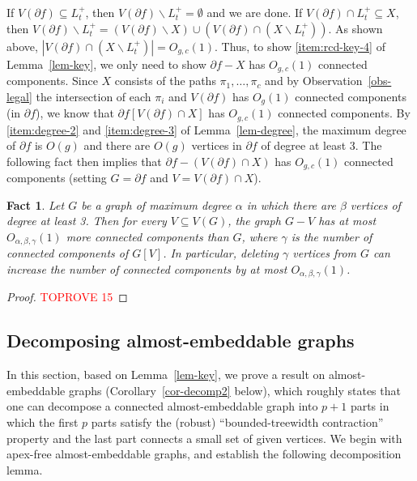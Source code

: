 \documentclass[a4paper,11pt]{article}
\numberwithin{lemma}{section}
\newtheorem{fact}[lemma]{Fact}
\begin{document}
If $V(\partial f) \subseteq L_t^+$, then $V(\partial f) \backslash L_t^+ = \emptyset$ and we are done.
If $V(\partial f) \cap L_t^+ \subseteq X$, then $V(\partial f) \backslash L_t^+ = (V(\partial f) \backslash X) \cup (V(\partial f) \cap (X \backslash L_t^+))$.
As shown above, $|V(\partial f) \cap (X \backslash L_t^+)| = O_{g,c}(1)$.
Thus, to show \ref{item:rcd-key-4} of Lemma~\ref{lem-key}, we only need to show $\partial f - X$ has $O_{g,c}(1)$ connected components.
Since $X$ consists of the paths $\pi_1,\dots,\pi_c$ and by Observation~\ref{obs-legal} the intersection of each $\pi_i$ and $V(\partial f)$ has $O_g(1)$ connected components (in $\partial f$), we know that $\partial f[V(\partial f) \cap X]$ has $O_{g,c}(1)$ connected components.
By \ref{item:degree-2} and \ref{item:degree-3} of Lemma~\ref{lem-degree}, the maximum degree of $\partial f$ is $O(g)$ and there are $O(g)$ vertices in $\partial f$ of degree at least 3.
The following fact then implies that $\partial f - (V(\partial f) \cap X)$ has $O_{g,c}(1)$ connected components (setting $G = \partial f$ and $V = V(\partial f) \cap X$).

\begin{fact}\label{fact-components}
Let $G$ be a graph of maximum degree $\alpha$ in which there are $\beta$ vertices of degree at least 3.
Then for every $V \subseteq V(G)$, the graph $G-V$ has at most $O_{\alpha,\beta,\gamma}(1)$ more connected components than $G$, where $\gamma$ is the number of connected components of $G[V]$.
In particular, deleting $\gamma$ vertices from $G$ can increase the number of connected components by at most $O_{\alpha,\beta,\gamma}(1)$.
\end{fact}

\begin{proof}\textcolor{red}{TOPROVE 15}\end{proof}
 
\subsection{Decomposing almost-embeddable graphs}
In this section, based on Lemma~\ref{lem-key}, we prove a result on almost-embeddable graphs (Corollary~\ref{cor-decomp2} below), which roughly states that one can decompose a connected almost-embeddable graph into $p+1$ parts in which the first $p$ parts satisfy the (robust) ``bounded-treewidth contraction'' property and the last part connects a small set of given vertices.
We begin with apex-free almost-embeddable graphs, and establish the following decomposition lemma.
\end{document}
